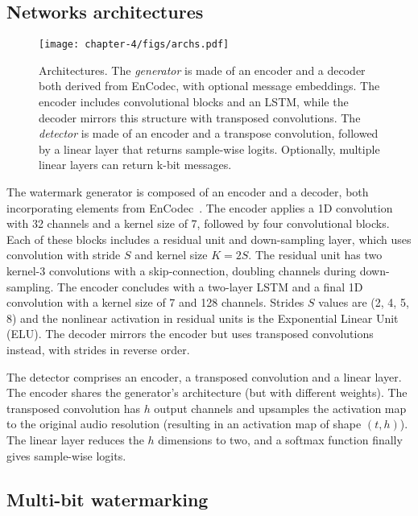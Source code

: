 \subsection{Networks architectures}


\begin{figure}[b!]
    \centering
    \texttt{[image: chapter-4/figs/archs.pdf]}
    \caption{
        Architectures. 
        The \emph{generator} is made of an encoder and a decoder both derived from EnCodec, with optional message embeddings. 
        The encoder includes convolutional blocks and an LSTM, while the decoder mirrors this structure with transposed convolutions.
        The \emph{detector} is made of an encoder and a transpose convolution, followed by a linear layer that returns sample-wise logits. 
        Optionally, multiple linear layers can return k-bit messages.
    }
    \label{chap4/fig:archs}
\end{figure}

The watermark generator is composed of an encoder and a decoder, both incorporating elements from EnCodec~\citep{defossez2022high}. 
The encoder applies a 1D convolution with 32 channels and a kernel size of 7, followed by four convolutional blocks. Each of these blocks includes a residual unit and down-sampling layer, which uses convolution with stride $S$ and kernel size $K = 2S$.
The residual unit has two kernel-3 convolutions with a skip-connection, doubling channels during down-sampling. The encoder concludes with a two-layer LSTM and a final 1D convolution with a kernel size of 7 and 128 channels. 
Strides $S$ values are (2, 4, 5, 8) and the nonlinear activation in residual units is the Exponential Linear Unit (ELU). 
The decoder mirrors the encoder but uses transposed convolutions instead, with strides in reverse order.

The detector comprises an encoder, a transposed convolution and a linear layer. 
The encoder shares the generator's architecture (but with different weights). 
The transposed convolution has $h$ output channels and upsamples the activation map to the original audio resolution (resulting in an activation map of shape $(t, h)$). 
The linear layer reduces the $h$ dimensions to two, and a softmax function finally gives sample-wise logits.







\subsection{Multi-bit watermarking}

